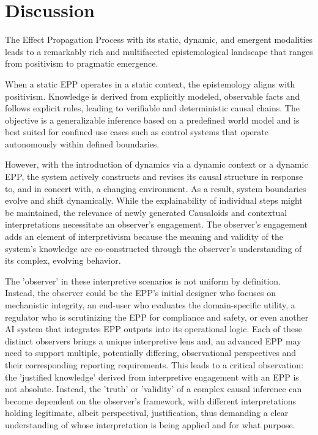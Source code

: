 \section{Discussion}
\label{bsec:Discussion}

The Effect Propagation Process with its static, dynamic, and emergent modalities leads to a remarkably rich and multifaceted epistemological landscape that ranges from positivism to pragmatic emergence.

When a static EPP operates in a static context, the epistemology aligns with positivism. Knowledge is derived from explicitly modeled, observable facts and follows explicit rules, leading to verifiable and deterministic causal chains. The objective is a generalizable inference based on a predefined world model and is best suited for confined use cases such as control systems that operate autonomously within defined boundaries.

However, with the introduction of dynamics via a dynamic context or a dynamic EPP, the system actively constructs and revises its causal structure in response to, and in concert with, a changing environment. As a result, system boundaries evolve and shift dynamically. While the explainability of individual steps might be maintained, the relevance of newly generated Causaloids and contextual interpretations necessitate an observer's engagement.
The observer's engagement adds an element of interpretivism because the meaning and validity of the system's knowledge are co-constructed through the observer's understanding of its complex, evolving behavior.

The 'observer' in these interpretive scenarios is not uniform by definition. Instead, the observer could be the EPP's initial designer who focuses on mechanistic integrity, an end-user who evaluates the domain-specific utility, a regulator who is scrutinizing the EPP for compliance and safety, or even another AI system that integrates EPP outputs into its operational logic. Each of these distinct observers brings a unique interpretive lens and, an advanced EPP may need to support multiple, potentially differing, observational perspectives and their corresponding reporting requirements. This leads to a critical observation: the 'justified knowledge' derived from interpretive engagement with an EPP is not absolute. Instead, the 'truth' or 'validity' of a complex causal inference can become dependent on the observer's framework, with different interpretations holding legitimate, albeit perspectival, justification, thus demanding a clear understanding of whose interpretation is being applied and for what purpose.

